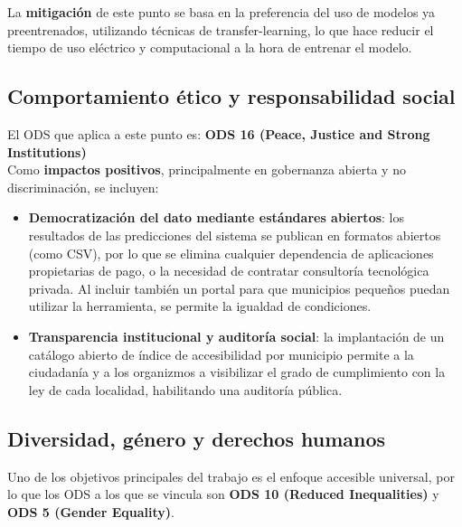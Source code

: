 La \textbf{mitigación} de este punto se basa en la preferencia del uso de modelos ya preentrenados, utilizando técnicas de \gls{transfer-learning}, lo que hace reducir el tiempo de uso eléctrico y computacional a la hora de entrenar el modelo.

\subsection{Comportamiento ético y responsabilidad social}

El ODS que aplica a este punto es: \textbf{ODS 16 (Peace, Justice and Strong Institutions)}
\\

Como \textbf{impactos positivos}, principalmente en gobernanza abierta y no discriminación, se incluyen:
\begin{itemize}
    \item \textbf{Democratización del dato mediante estándares abiertos}: los resultados de las predicciones del sistema se publican en formatos abiertos (como CSV), por lo que se elimina cualquier dependencia de aplicaciones propietarias de pago, o la necesidad de contratar consultoría tecnológica privada. Al incluir también un portal para que municipios pequeños puedan utilizar la herramienta, se permite la igualdad de condiciones.
    \item \textbf{Transparencia institucional y auditoría social}: la implantación de un catálogo abierto de índice de accesibilidad por municipio permite a la ciudadanía y a los organizmos a visibilizar el grado de cumplimiento con la ley de cada localidad, habilitando una auditoría pública.
\end{itemize}

\subsection{Diversidad, género y derechos humanos}

Uno de los objetivos principales del trabajo es el enfoque accesible universal, por lo que los ODS a los que se vincula son \textbf{ODS 10 (Reduced Inequalities)} y \textbf{ODS 5 (Gender Equality)}.
\\

